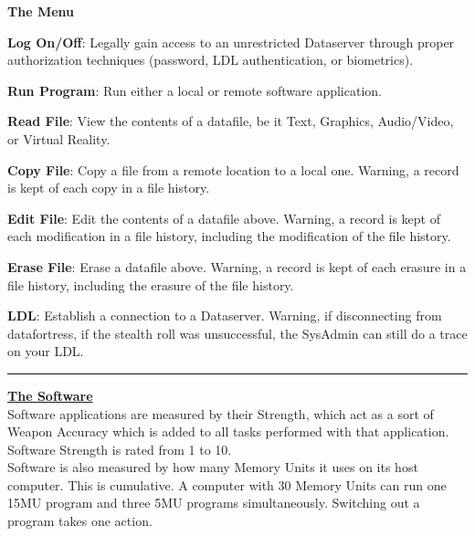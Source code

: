 \documentclass[11pt,twoside,a4paper]{article}
\newenvironment{local_itemize}{
\begin{itemize}
     \setlength{\itemsep}{1pt}
     \setlength{\parskip}{0pt}
     \setlength{\parsep}{0pt}}
{\end{itemize}
}
\begin{document}
\begin{multicols*}{2}
\textbf{The Menu}
\begin{local_itemize}
	\item \textbf{Log On/Off}: Legally gain access to an unrestricted Dataserver through proper authorization techniques (password, LDL authentication, or biometrics).
	\item \textbf{Run Program}: Run either a local or remote software application.
	\item \textbf{Read File}: View the contents of a datafile, be it Text, Graphics, Audio/Video, or Virtual Reality.
	\item \textbf{Copy File}: Copy a file from a remote location to a local one. Warning, a record is kept of each copy in a file history.
	\item \textbf{Edit File}: Edit the contents of a datafile above. Warning, a record is kept of each modification in a file history, including the modification of the file history.
	\item \textbf{Erase File}: Erase a datafile above. Warning, a record is kept of each erasure in a file history, including the erasure of the file history.
	\item \textbf{LDL}: Establish a connection to a Dataserver. Warning, if disconnecting from datafortress, if the stealth roll was unsuccessful, the SysAdmin can still do a trace on your LDL.
\end{local_itemize}

\end{multicols*}

\clearpage

\begin{center} \rule{0.85\textwidth}{0.01cm} \end{center}

\textbf{\underline{\large The Software}}~\\

Software applications are measured by their Strength, which act as a sort of Weapon Accuracy which is added to all tasks performed with that application. Software Strength is rated from 1 to 10. ~\\

Software is also measured by how many Memory Units it uses on its host computer. This is cumulative. A computer with 30 Memory Units can run one 15MU program and three 5MU programs simultaneously. Switching out a program takes one action. ~\\
\end{document}
